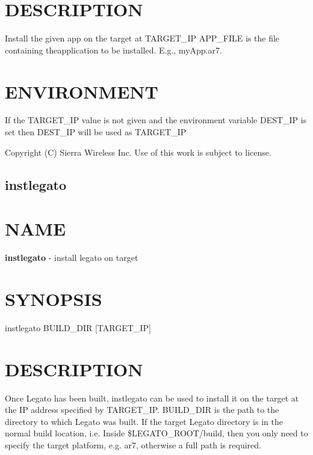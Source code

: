 \section*{D\+E\+S\+C\+R\+I\+P\+T\+I\+O\+N}

Install the given app on the target at T\+A\+R\+G\+E\+T\+\_\+\+I\+P A\+P\+P\+\_\+\+F\+I\+L\+E is the file containing theapplication to be installed. E.\+g., \textquotesingle{}my\+App.\+ar7\textquotesingle{}.

\section*{E\+N\+V\+I\+R\+O\+N\+M\+E\+N\+T}

\begin{DoxyVerb}If the TARGET_IP value is not given and the environment variable DEST_IP
is set then DEST_IP will be used as TARGET_IP
\end{DoxyVerb}




 Copyright (C) Sierra Wireless Inc. Use of this work is subject to license. \hypertarget{toolsHost_instlegato}{}\subsection{instlegato}\label{toolsHost_instlegato}
\section*{N\+A\+M\+E}

{\bfseries instlegato} -\/ install legato on target

\section*{S\+Y\+N\+O\+P\+S\+I\+S}

{\ttfamily instlegato B\+U\+I\+L\+D\+\_\+\+D\+I\+R \mbox{[}T\+A\+R\+G\+E\+T\+\_\+\+I\+P\mbox{]}}~\newline


\section*{D\+E\+S\+C\+R\+I\+P\+T\+I\+O\+N}

Once Legato has been built, instlegato can be used to install it on the target at the I\+P address specified by T\+A\+R\+G\+E\+T\+\_\+\+I\+P. B\+U\+I\+L\+D\+\_\+\+D\+I\+R is the path to the directory to which Legato was built. If the target Legato directory is in the normal build location, i.\+e. Inside \$\+L\+E\+G\+A\+T\+O\+\_\+\+R\+O\+O\+T/build, then you only need to specify the target platform, e.\+g. ar7, otherwise a full path is required.

